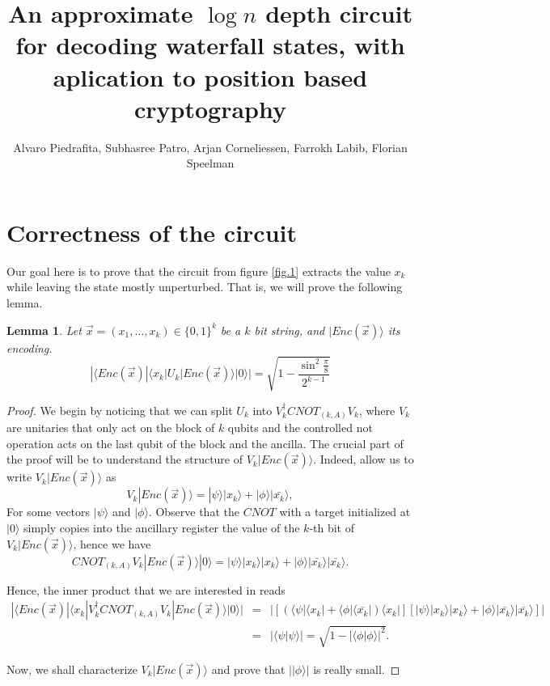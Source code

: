 \documentclass{article}
\newtheorem{lemma}[theorem]{Lemma}
\theoremstyle{definition}
\newcommand{\ket}[1]{|#1\rangle}
\newcommand{\bra}[1]{\langle#1|}
\newcommand{\braket}[2]{\langle{#1}|{#2}\rangle}
\begin{document}
\title{\large {\bf An approximate $\log n$ depth circuit for decoding waterfall states, with aplication to position based cryptography}}
\author{Alvaro Piedrafita, Subhasree Patro, Arjan Corneliessen, Farrokh Labib, Florian Speelman}
\maketitle





\section{Correctness of the circuit}

 Our goal here is to prove that the circuit from figure \ref{fig.1} extracts the value $x_k$ while leaving the state mostly unperturbed. That is, we will prove the following lemma.

\begin{lemma}
Let $\vec{x}=(x_1,\dots,x_k)\in\{0,1\}^k$ be a $k$ bit string, and $\ket{Enc(\vec{x})}$ its encoding.
\begin{equation}
|\bra{Enc(\vec{x})}\bra{x_k}U_k\ket{Enc(\vec{x})}\ket{0}|= \sqrt{1-\frac{\sin^2\frac{\pi}{8}}{2^{k-1}}}
\end{equation}
\end{lemma}
\begin{proof}
We begin by noticing that we can split $U_k$ into $V_k^\dagger CNOT_{(k,A)}V_k$, where $V_k$ are unitaries that only act on the block of $k$ qubits and the controlled not operation acts on the last qubit of the block and the ancilla. The crucial part of the proof will be to understand the structure of  $V_k\ket{Enc(\vec{x})}$. Indeed, allow us to write  $V_k\ket{Enc(\vec{x})}$ as
\[V_k\ket{Enc(\vec{x})}=\ket{\psi}\ket{x_k}+\ket{\phi}\ket{\bar{x_k}},\]
For some vectors $\ket{\psi}$ and $\ket{\phi}$. Observe that the $CNOT$ with a target initialized at $\ket{0}$ simply copies into the ancillary register the value of the $k$-th bit of $V_k\ket{Enc(\vec{x})}$, hence we have
\begin{equation}
CNOT_{(k,A)}V_k\ket{Enc(\vec{x})}\ket{0}=\ket{\psi}\ket{x_k}\ket{x_k}+\ket{\phi}\ket{\bar{x_k}}\ket{\bar{x_k}}.
\end{equation}

Hence, the inner product that we are interested in reads
\begin{eqnarray}
|\bra{Enc(\vec{x})}\bra{x_k}V_k^\dagger CNOT_{(k,A)}V_k\ket{Enc(\vec{x})}\ket{0}|&=&|\left[\left(\bra{\psi}\bra{x_k}+\bra{\phi}\bra{\bar{x_k}}\right)\bra{x_k}\right]\left[\ket{\psi}\ket{x_k}\ket{x_k}+\ket{\phi}\ket{\bar{x_k}}\ket{\bar{x_k}}\right]|\\
&=&|\braket{\psi}{\psi}|=\sqrt{1-|\braket{\phi}{\phi}|^2}.
\end{eqnarray}

Now, we shall characterize $V_k\ket{Enc(\vec{x})}$ and prove that $|\ket{\phi}|$ is really small.
\end{proof}
\end{document}
